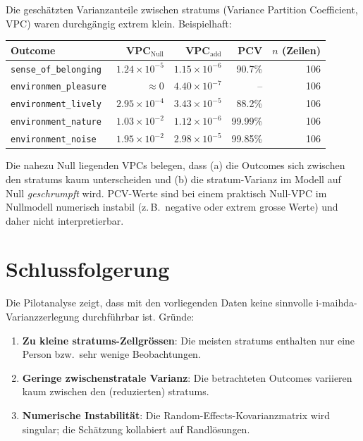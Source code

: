 Die geschätzten Varianzanteile zwischen \glspl{stratum} (Variance Partition Coefficient, VPC) waren durchgängig extrem klein. Beispielhaft:

\begin{center}
\begin{tabular}{lrrrr}
\toprule
Outcome & VPC$_{\text{Null}}$ & VPC$_{\text{add}}$ & PCV & $n$ (Zeilen) \\
\midrule
\texttt{sense\_of\_belonging}      & $1.24\times 10^{-5}$ & $1.15\times 10^{-6}$ & 90.7\% & 106 \\
\texttt{environmen\_pleasure}      & $\approx 0$          & $4.40\times 10^{-7}$ & --      & 106 \\
\texttt{environment\_lively}       & $2.95\times 10^{-4}$ & $3.43\times 10^{-5}$ & 88.2\%  & 106 \\
\texttt{environment\_nature}       & $1.03\times 10^{-2}$ & $1.12\times 10^{-6}$ & 99.99\% & 106 \\
\texttt{environment\_noise}        & $1.95\times 10^{-2}$ & $2.98\times 10^{-5}$ & 99.85\% & 106 \\
\bottomrule
\end{tabular}
\end{center}

Die nahezu Null liegenden VPCs belegen, dass (a) die Outcomes sich zwischen den \glspl{stratum} kaum unterscheiden und (b) die \gls{stratum}-Varianz im Modell auf Null \emph{geschrumpft} wird. PCV-Werte sind bei einem praktisch Null-VPC im Nullmodell numerisch instabil (z.\,B.\ negative oder extrem grosse Werte) und daher nicht interpretierbar.

\section{Schlussfolgerung}
Die Pilotanalyse zeigt, dass mit den vorliegenden Daten keine sinnvolle \gls{i-maihda}-Varianzzerlegung durchführbar ist. Gründe:
\begin{enumerate}
    \item \textbf{Zu kleine \glspl{stratum}-Zellgrössen}: Die meisten \glspl{stratum} enthalten nur eine Person bzw.\ sehr wenige Beobachtungen.
    \item \textbf{Geringe zwischenstratale Varianz}: Die betrachteten Outcomes variieren kaum zwischen den (reduzierten) \glspl{stratum}.
    \item \textbf{Numerische Instabilität}: Die Random-Effects-Kovarianzmatrix wird singular; die Schätzung kollabiert auf Randlösungen.
\end{enumerate}

